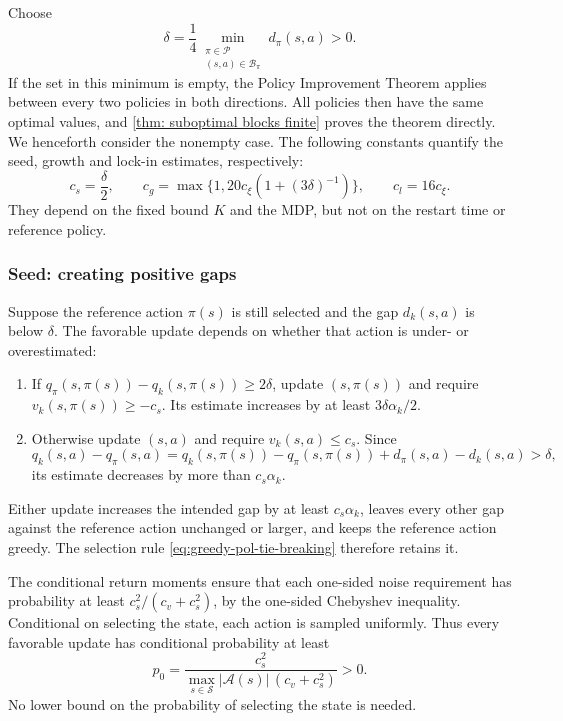 Choose
\begin{equation}
\label{eq:constants}
\delta=\frac14\min_{\substack{\pi\in\mathcal P\\(s,a)\in\mathcal B_\pi}}d_\pi(s,a)>0.
\end{equation}
If the set in this minimum is empty, the Policy Improvement Theorem applies between every two policies in both directions. All policies then have the same optimal values, and \autoref{thm: suboptimal blocks finite} proves the theorem directly. We henceforth consider the nonempty case.
The following constants quantify the seed, growth and lock-in estimates, respectively:
\begin{equation}
\label{eq:c-def}
c_s=\frac\delta2,
\qquad c_g=\max\{1,20c_\xi(1+(3\delta)^{-1})\},
\qquad c_l=16c_\xi.
\end{equation}
They depend on the fixed bound $K$ and the MDP, but not on the restart time or reference policy.

\subsubsection{Seed: creating positive gaps}
Suppose the reference action $\pi(s)$ is still selected and the gap $d_k(s,a)$ is below $\delta$. The favorable update depends on whether that action is under- or overestimated:
\begin{enumerate}
\item If $q_\pi(s,\pi(s))-q_k(s,\pi(s))\ge2\delta$, update $(s,\pi(s))$ and require $v_k(s,\pi(s))\ge-c_s$. Its estimate increases by at least $3\delta\alpha_k/2$.
\item Otherwise update $(s,a)$ and require $v_k(s,a)\le c_s$. Since
\[
q_k(s,a)-q_\pi(s,a)
=q_k(s,\pi(s))-q_\pi(s,\pi(s))+d_\pi(s,a)-d_k(s,a)>\delta,
\]
its estimate decreases by more than $c_s\alpha_k$.
\end{enumerate}
Either update increases the intended gap by at least $c_s\alpha_k$, leaves every other gap against the reference action unchanged or larger, and keeps the reference action greedy. The selection rule \eqref{eq:greedy-pol-tie-breaking} therefore retains it.

The conditional return moments ensure that each one-sided noise requirement has probability at least $c_s^2/(c_v+c_s^2)$, by the one-sided Chebyshev inequality. Conditional on selecting the state, each action is sampled uniformly. Thus every favorable update has conditional probability at least
\begin{equation}
\label{eq:localprob}
p_0=\frac{c_s^2}{\max_{s\in\mathcal S}|\mathcal A(s)|\,(c_v+c_s^2)}>0.
\end{equation}
No lower bound on the probability of selecting the state is needed.

